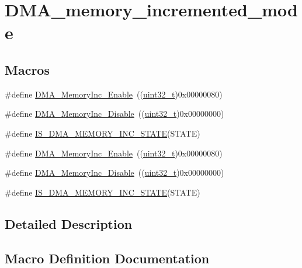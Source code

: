 \hypertarget{group___d_m_a__memory__incremented__mode}{}\section{D\+M\+A\+\_\+memory\+\_\+incremented\+\_\+mode}
\label{group___d_m_a__memory__incremented__mode}
\subsection*{Macros}
\begin{DoxyCompactItemize}
\item 
\#define \hyperlink{group___d_m_a__memory__incremented__mode_ga4e8cb23d039c74bbbf365d7678835bbb}{D\+M\+A\+\_\+\+Memory\+Inc\+\_\+\+Enable}~((\hyperlink{_p_e___types_8h_a33594304e786b158f3fb30289278f5af}{uint32\+\_\+t})0x00000080)
\item 
\#define \hyperlink{group___d_m_a__memory__incremented__mode_ga795a277c997048783a383b026f19a5ab}{D\+M\+A\+\_\+\+Memory\+Inc\+\_\+\+Disable}~((\hyperlink{_p_e___types_8h_a33594304e786b158f3fb30289278f5af}{uint32\+\_\+t})0x00000000)
\item 
\#define \hyperlink{group___d_m_a__memory__incremented__mode_gaa880f39d499d1e80449cf80381e4eb67}{I\+S\+\_\+\+D\+M\+A\+\_\+\+M\+E\+M\+O\+R\+Y\+\_\+\+I\+N\+C\+\_\+\+S\+T\+A\+TE}(S\+T\+A\+TE)
\item 
\#define \hyperlink{group___d_m_a__memory__incremented__mode_ga4e8cb23d039c74bbbf365d7678835bbb}{D\+M\+A\+\_\+\+Memory\+Inc\+\_\+\+Enable}~((\hyperlink{_p_e___types_8h_a33594304e786b158f3fb30289278f5af}{uint32\+\_\+t})0x00000080)
\item 
\#define \hyperlink{group___d_m_a__memory__incremented__mode_ga795a277c997048783a383b026f19a5ab}{D\+M\+A\+\_\+\+Memory\+Inc\+\_\+\+Disable}~((\hyperlink{_p_e___types_8h_a33594304e786b158f3fb30289278f5af}{uint32\+\_\+t})0x00000000)
\item 
\#define \hyperlink{group___d_m_a__memory__incremented__mode_gaa880f39d499d1e80449cf80381e4eb67}{I\+S\+\_\+\+D\+M\+A\+\_\+\+M\+E\+M\+O\+R\+Y\+\_\+\+I\+N\+C\+\_\+\+S\+T\+A\+TE}(S\+T\+A\+TE)
\end{DoxyCompactItemize}


\subsection{Detailed Description}


\subsection{Macro Definition Documentation}
